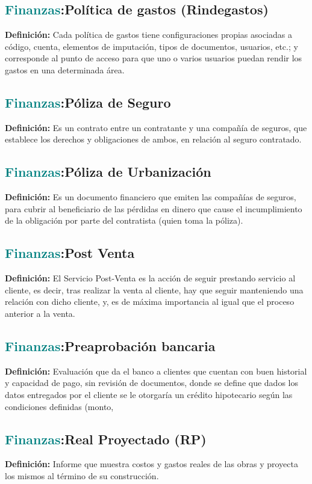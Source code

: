 \documentclass[12pt]{article}
\begin{document}
\subsection{\textcolor{teal}{Finanzas}:{Política de gastos (Rindegastos)}}
\textbf{Definición:} Cada política de gastos tiene configuraciones propias asociadas a código, cuenta, elementos de imputación, tipos de documentos, usuarios, etc.; y corresponde al punto de acceso para que uno o varios usuarios puedan rendir los gastos en una determinada área.
\subsection{\textcolor{teal}{Finanzas}:{Póliza de Seguro}}
\textbf{Definición:} Es un contrato entre un contratante y una compañía de seguros, que establece los derechos y obligaciones de ambos, en relación al seguro contratado.
\subsection{\textcolor{teal}{Finanzas}:{Póliza de Urbanización}}
\textbf{Definición:} Es un documento financiero que emiten las compañías de seguros, para cubrir al beneficiario de las pérdidas en dinero que cause el incumplimiento de la obligación por parte del contratista (quien toma la póliza).
\subsection{\textcolor{teal}{Finanzas}:{Post Venta}}
\textbf{Definición:} El Servicio Post-Venta es la acción de seguir prestando servicio al cliente, es decir, tras realizar la venta al cliente, hay que seguir manteniendo una relación con dicho cliente, y, es de máxima importancia al igual que el proceso anterior a la venta.
\subsection{\textcolor{teal}{Finanzas}:{Preaprobación bancaria}}
\textbf{Definición:} Evaluación que da el banco a clientes que cuentan con buen historial y capacidad de pago, sin revisión de documentos, donde se define que dados los datos entregados por el cliente se le otorgaría un crédito hipotecario según las condiciones definidas (monto, %
\subsection{\textcolor{teal}{Finanzas}:{Real Proyectado (RP)}}
\textbf{Definición:} Informe que muestra costos y gastos reales de las obras y proyecta los mismos al término de su construcción.
\end{document}
